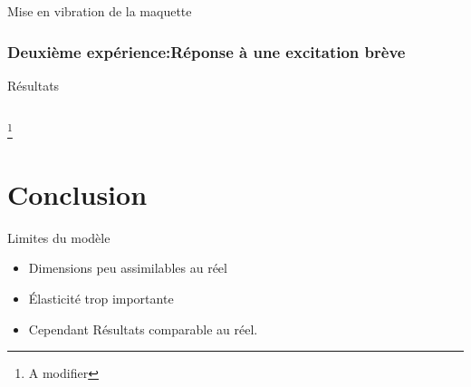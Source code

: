 \documentclass{beamer}
\begin{document}
	
	
	
	\begin{frame}{Mise en vibration de la maquette}
		\frametitle{Deuxième expérience:Réponse à une excitation brève}
		\centering Résultats
		\vspace{12pt}
		\begin{columns}[onlytextwidth]
			\begin{column}{0.33\textwidth}
				\centering
			\end{column}
			\begin{column}{0.33\textwidth}
				\centering
			\end{column}
			\begin{column}{0.33\textwidth}
				\centering
			\end{column}
		\end{columns}
		\footnote{A modifier}
	\end{frame}
	
	
	
	
	

	
	
			
	
	\section{Conclusion}
	
	\begin{frame}{Limites du modèle}
		\begin{itemize}
			\item Dimensions peu assimilables au réel
			\item Élasticité trop importante 
			\item Cependant Résultats comparable au réel.
		\end{itemize}	
		\vspace{12pt}
		
	\end{frame}
	
\end{document}
